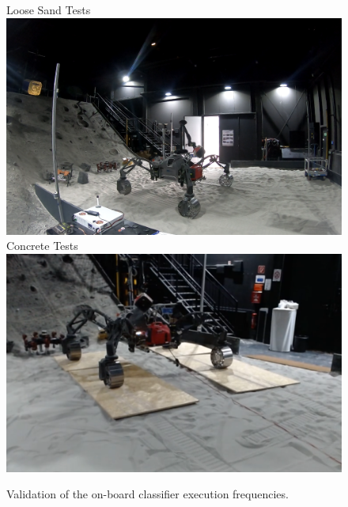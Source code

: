 \begin{figure}[!htbp]
    \centering
    \subcaptionbox
        {Loose Sand Tests}
        {
        \includegraphics[width=\columnwidth]{../figures/spacehall.png}
        }
    \subcaptionbox
        {Concrete Tests}
        {\includegraphics[width=\columnwidth]{../figures/spacehallconcrete.png}}
    \caption{Validation of the on-board classifier execution frequencies.}
    \label{fig:sh-tests}
\end{figure}

